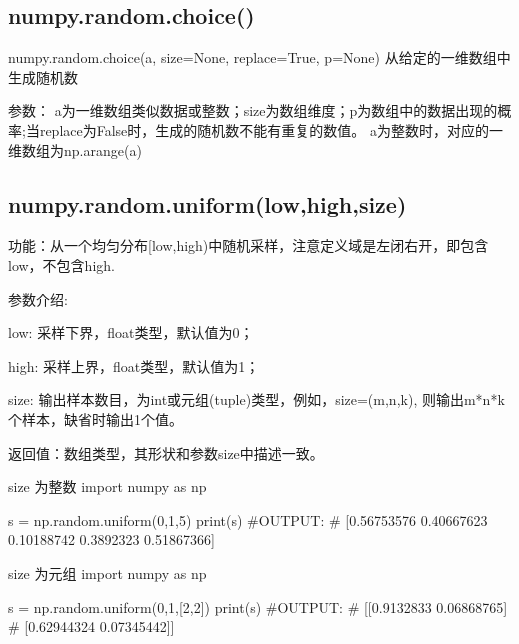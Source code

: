 \documentclass[11pt]{article}
\begin{document}
\subsection{numpy.random.choice()}
numpy.random.choice(a, size=None, replace=True, p=None)
从给定的一维数组中生成随机数

参数： a为一维数组类似数据或整数；size为数组维度；p为数组中的数据出现的概率;当replace为False时，生成的随机数不能有重复的数值。
a为整数时，对应的一维数组为np.arange(a)

\subsection{numpy.random.uniform(low,high,size)}
功能：从一个均匀分布[low,high)中随机采样，注意定义域是左闭右开，即包含low，不包含high.

参数介绍:

low: 采样下界，float类型，默认值为0；

high: 采样上界，float类型，默认值为1；

size: 输出样本数目，为int或元组(tuple)类型，例如，size=(m,n,k), 则输出m*n*k个样本，缺省时输出1个值。

返回值：数组类型，其形状和参数size中描述一致。
\begin{Python}{size 为整数}
import numpy as np

s = np.random.uniform(0,1,5)
print(s)
#OUTPUT:
#       [0.56753576 0.40667623 0.10188742 0.3892323  0.51867366]
\end{Python}
\begin{Python}{size 为元组}
import numpy as np

s = np.random.uniform(0,1,[2,2])
print(s)
#OUTPUT:
#       [[0.9132833  0.06868765]
#        [0.62944324 0.07345442]]
\end{Python}
\end{document}
